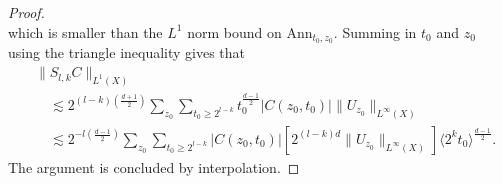 \begin{proof}
\begin{equation}
    \end{equation}
    which is smaller than the $L^1$ norm bound on $\text{Ann}_{t_0,z_0}$.
    Summing in $t_0$ and $z_0$ using the triangle inequality gives that
    \begin{equation}
    \begin{split}
        &\| S_{l,k} C \|_{L^1(X)}\\
        &\quad \lesssim 2^{(l-k) \left( \frac{d+1}{2}\right)} \sum\nolimits_{z_0} \sum\nolimits_{t_0 \geq 2^{l-k}} t_0^{\frac{d-1}{2}} |C(z_0,t_0)| \| U_{z_0} \|_{L^\infty(X)}\\
        &\quad \lesssim 2^{-l \left( \frac{d-1}{2} \right)} \sum\nolimits_{z_0} \sum\nolimits_{t_0 \geq 2^{l-k}} |C(z_0,t_0)| \left[  2^{(l-k)d} \| U_{z_0} \|_{L^\infty(X)}\right] \langle 2^k t_0 \rangle^{\frac{d-1}{2}}.
    \end{split}
    \end{equation}
    The argument is concluded by interpolation.
\end{proof}

